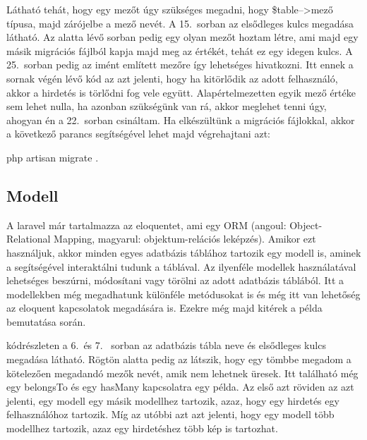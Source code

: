 \documentclass[]{thesis-ekf}
\theoremstyle{definition}
\theoremstyle{remark}
\begin{document}
	
	
	Látható tehát, hogy egy mezőt úgy szükséges megadni, hogy \$table-->mező típusa, majd zárójelbe a mező nevét.
	A 15.~sorban az elsődleges kulcs megadása látható. Az alatta lévő sorban pedig egy olyan mezőt hoztam létre, ami majd egy másik migrációs fájlból kapja majd meg az értékét, tehát ez egy idegen kulcs. A 25.~sorban pedig az imént említett mezőre így lehetséges hivatkozni. Itt ennek a sornak végén lévő kód az azt jelenti, hogy ha kitörlődik az adott felhasználó, akkor a hirdetés is törlődni fog vele együtt. Alapértelmezetten egyik mező értéke sem lehet nulla, ha azonban szükségünk van rá, akkor meglehet tenni úgy, ahogyan én a 22.~sorban csináltam. Ha elkészültünk a migrációs fájlokkal, akkor a következő parancs segítségével lehet majd végrehajtani azt:
	\begin{center}
		php artisan migrate .
	\end{center}
	\subsection{Modell}
	A laravel már tartalmazza az eloquentet, ami egy ORM (angoul: Object-Relational Mapping, magyarul: objektum-relációs leképzés). Amikor ezt használjuk, akkor minden egyes adatbázis táblához tartozik egy modell is, aminek a segítségével interaktálni tudunk a táblával. Az ilyenféle modellek használatával lehetséges beszúrni, módosítani vagy törölni az adott adatbázis táblából. Itt a modellekben még megadhatunk különféle metódusokat is és még itt van lehetőség az eloquent kapcsolatok megadására is. Ezekre még majd kitérek a példa bemutatása során.\cite{Laravel}
	
	
	
	 kódrészleten a 6.~és 7.~ sorban az adatbázis tábla neve és elsődleges kulcs megadása látható. Rögtön alatta pedig az látszik, hogy egy tömbbe megadom a kötelezően megadandó mezők nevét, amik nem lehetnek üresek. Itt található még egy belongsTo és egy hasMany kapcsolatra egy példa. Az első azt röviden az azt jelenti, egy modell egy másik modellhez tartozik, azaz, hogy egy hirdetés egy felhasználóhoz tartozik. Míg az utóbbi azt azt jelenti, hogy egy modell több modellhez tartozik, azaz egy hirdetéshez több kép is tartozhat.
	
\end{document}
